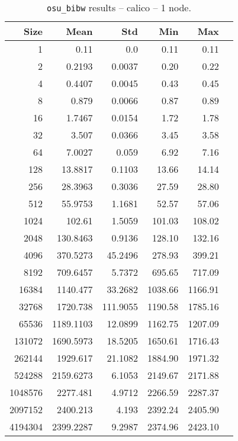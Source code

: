 
\begin{table}[htbp]
  \centering
  \begin{minipage}{.48\textwidth}
    \centering
    \footnotesize
  \begin{tabular}{rrrrrr}
	\toprule
	\textbf{Size} & \textbf{Mean} & \textbf{Std} & \textbf{Min} & \textbf{Max}	\\
	\midrule
	1	&	0.11   	&	0.0	&	0.11	&	0.11	\\
	2	&	0.2193   	&	0.0037	&	0.20	&	0.22	\\
	4	&	0.4407   	&	0.0045	&	0.43	&	0.45	\\
	8	&	0.879   	&	0.0066	&	0.87	&	0.89	\\
	16	&	1.7467   	&	0.0154	&	1.72	&	1.78	\\
	32	&	3.507   	&	0.0366	&	3.45	&	3.58	\\
	64	&	7.0027   	&	0.059	&	6.92	&	7.16	\\
	128	&	13.8817   	&	0.1103	&	13.66	&	14.14	\\
	256	&	28.3963   	&	0.3036	&	27.59	&	28.80	\\
	512	&	55.9753   	&	1.1681	&	52.57	&	57.06	\\
	1024	&	102.61   	&	1.5059	&	101.03	&	108.02	\\
	2048	&	130.8463   	&	0.9136	&	128.10	&	132.16	\\
	4096	&	370.5273   	&	45.2496	&	278.93	&	399.21	\\
	8192	&	709.6457   	&	5.7372	&	695.65	&	717.09	\\
	16384	&	1140.477   	&	33.2682	&	1038.66	&	1166.91	\\
	32768	&	1720.738   	&	111.9055	&	1190.58	&	1785.16	\\
	65536	&	1189.1103   	&	12.0899	&	1162.75	&	1207.09	\\
	131072	&	1690.5973   	&	18.5205	&	1650.61	&	1716.43	\\
	262144	&	1929.617   	&	21.1082	&	1884.90	&	1971.32	\\
	524288	&	2159.6273   	&	6.1053	&	2149.67	&	2171.88	\\
	1048576	&	2277.481   	&	4.9712	&	2266.59	&	2287.37	\\
	2097152	&	2400.213   	&	4.193	&	2392.24	&	2405.90	\\
	4194304	&	2399.2287   	&	9.2987	&	2374.96	&	2423.10	\\
	\bottomrule
	\end{tabular}
  \caption{\texttt{osu\_bibw} results -- calico -- 1 node.}

\end{minipage}
\end{table}
